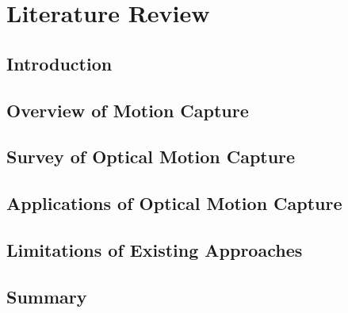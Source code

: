 \chapter{Literature Review}
\label{Literature_Review}
 
\section{Introduction}
\section{Overview of Motion Capture}
\section{Survey of Optical Motion Capture}
\section{Applications of Optical Motion Capture}
\section{Limitations of Existing Approaches}
\section{Summary}
